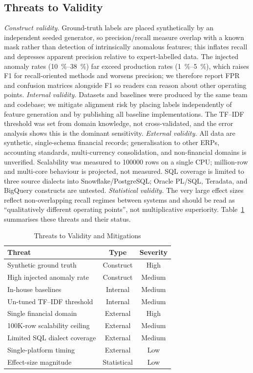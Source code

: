 \documentclass{ieeeaccess}
\begin{document}
\subsection{Threats to Validity}
\label{subsec:threats}
\emph{Construct validity.} Ground-truth labels are placed synthetically by an independent seeded generator, so
precision/recall measure overlap with a known mask rather than detection of intrinsically anomalous features; this
inflates recall and depresses apparent precision relative to expert-labelled data. The injected anomaly rates
(\SIrange{10}{38}{\percent}) far exceed production rates (\SIrange{1}{5}{\percent}), which raises F1 for recall-oriented
methods and worsens precision; we therefore report FPR and confusion matrices alongside F1 so readers can reason about
other operating points. \emph{Internal validity.} Datasets and baselines were produced by the same team and codebase; we
mitigate alignment risk by placing labels independently of feature generation and by publishing all baseline
implementations. The TF--IDF threshold was set from domain knowledge, not cross-validated, and the error analysis shows
this is the dominant sensitivity. \emph{External validity.} All data are synthetic, single-schema financial records;
generalisation to other ERPs, accounting standards, multi-currency consolidation, and non-financial domains is unverified.
Scalability was measured to \num{100000} rows on a single CPU; million-row and multi-core behaviour is projected, not
measured. SQL coverage is limited to three source dialects into Snowflake/PostgreSQL; Oracle PL/SQL, Teradata, and
BigQuery constructs are untested. \emph{Statistical validity.} The very large effect sizes reflect non-overlapping recall
regimes between systems and should be read as ``qualitatively different operating points'', not multiplicative
superiority. Table~\ref{tab:threats} summarises these threats and their status.

\begin{table}[tbp]
\centering
\caption{Threats to Validity and Mitigations}
\label{tab:threats}
\begin{tabular}{|l|c|c|}
\hline
\textbf{Threat} & \textbf{Type} & \textbf{Severity} \\
\hline
Synthetic ground truth & Construct & High \\
\hline
High injected anomaly rate & Construct & Medium \\
\hline
In-house baselines & Internal & Medium \\
\hline
Un-tuned TF--IDF threshold & Internal & Medium \\
\hline
Single financial domain & External & High \\
\hline
100K-row scalability ceiling & External & Medium \\
\hline
Limited SQL dialect coverage & External & Medium \\
\hline
Single-platform timing & External & Low \\
\hline
Effect-size magnitude & Statistical & Low \\
\hline
\end{tabular}
\end{table}
\end{document}
